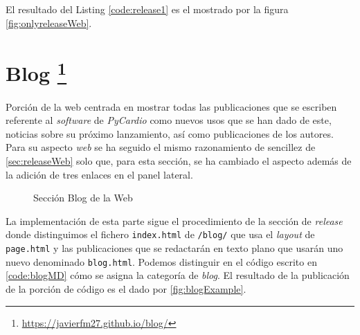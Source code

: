 El resultado del Listing \ref{code:release1} es el mostrado por la figura \ref{fig:onlyreleaseWeb}. 


\section[Blog]{Blog \footnote{\url{https://javierfm27.github.io/blog/}}}
\label{sec:blogWeb}
Porción de la web centrada en mostrar todas las publicaciones que se escriben referente al \textit{software} de \textit{PyCardio} como nuevos usos que se han dado de este, noticias sobre su próximo lanzamiento, así como  publicaciones de los autores. Para su aspecto \textit{web} se ha seguido el mismo razonamiento de sencillez  de \ref{sec:releaseWeb} solo que, para esta sección, se ha cambiado el aspecto además de la adición de tres enlaces en el panel lateral. 

\begin{figure}[H]
    \centering
    \caption{Sección Blog de la Web}
    \label{fig:blogWeb}
\end{figure}

La implementación de esta parte sigue el procedimiento de la sección de \textit{release} donde distinguimos el fichero \texttt{index.html} de \texttt{/blog/} que usa el \textit{layout} de \texttt{page.html} y las publicaciones que se redactarán en texto plano que usarán uno nuevo denominado \texttt{blog.html}. Podemos distinguir en el código escrito en \ref{code:blogMD} cómo se asigna la categoría de \textit{blog}. El resultado de la publicación de la porción de código es el dado por \ref{fig:blogExample}.

